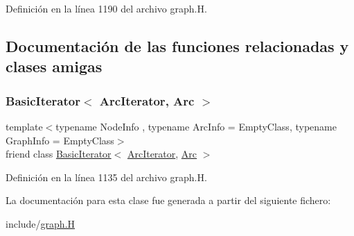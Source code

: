 Definición en la línea 1190 del archivo graph.\+H.



\subsection{Documentación de las funciones relacionadas y clases amigas}
\mbox{\label{class_designar_1_1_graph_1_1_arc_iterator_a530ad7c7218fa9b74a5cce004d0e3a1c}} 
\subsubsection{\texorpdfstring{Basic\+Iterator$<$ Arc\+Iterator, Arc $>$}{BasicIterator< ArcIterator, Arc >}}
{\footnotesize\ttfamily template$<$typename Node\+Info , typename Arc\+Info  = Empty\+Class, typename Graph\+Info  = Empty\+Class$>$ \\
friend class \hyperlink{class_designar_1_1_basic_iterator}{Basic\+Iterator}$<$ \hyperlink{class_designar_1_1_graph_1_1_arc_iterator}{Arc\+Iterator}, \hyperlink{class_designar_1_1_graph_a74c730ef4ce2d20f998d72bd25c2b5bf}{Arc} $>$\hspace{0.3cm}{\ttfamily [friend]}}



Definición en la línea 1135 del archivo graph.\+H.



La documentación para esta clase fue generada a partir del siguiente fichero\+:\begin{DoxyCompactItemize}
\item 
include/\hyperlink{graph_8_h}{graph.\+H}\end{DoxyCompactItemize}
